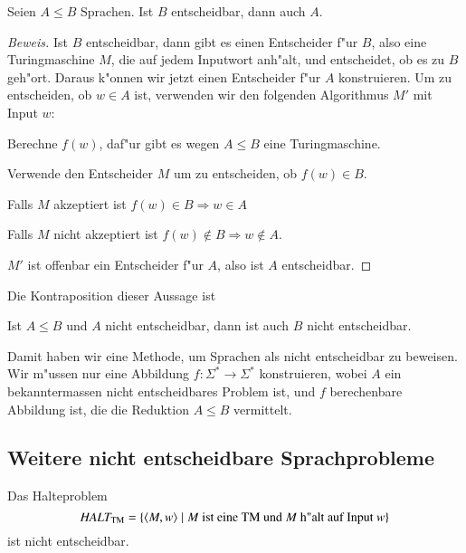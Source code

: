 \begin{satz}
Seien $A\le B$ Sprachen.
Ist $B$ entscheidbar, dann auch $A$.
\end{satz}

\begin{proof}[Beweis]
Ist $B$ entscheidbar, dann gibt es einen Entscheider f"ur $B$, also
eine Turingmaschine $M$, die auf jedem Inputwort anh"alt, und
entscheidet, ob es zu $B$ geh"ort.
Daraus k"onnen wir jetzt einen Entscheider f"ur $A$ konstruieren.
Um zu entscheiden, ob $w\in A$
ist, verwenden wir den folgenden Algorithmus $M'$ mit Input
$w$:
\medskip
\begin{compactenum}
\item Berechne $f(w)$, daf"ur gibt es wegen $A\le B$ eine Turingmaschine.
\item Verwende den Entscheider $M$ um zu entscheiden, ob $f(w)\in B$.
\item Falls $M$ akzeptiert ist $f(w)\in B\Rightarrow w\in A$
\item Falls $M$ nicht akzeptiert ist $f(w)\not\in B\Rightarrow w\not\in A$.
\end{compactenum}
\medskip
$M'$ ist offenbar ein Entscheider f"ur $A$, also ist $A$ entscheidbar.
\end{proof}

Die Kontraposition dieser Aussage ist
\begin{satz}
Ist $A\le B$ und $A$ nicht entscheidbar, dann ist auch $B$ nicht
entscheidbar.
\end{satz}
Damit haben wir eine Methode, um Sprachen als nicht entscheidbar 
zu beweisen.
Wir m"ussen nur eine Abbildung $f\colon \Sigma^*\to \Sigma^*$
konstruieren, wobei $A$ ein bekanntermassen nicht
entscheidbares Problem ist, und $f$ berechenbare Abbildung ist,
die die Reduktion $A\le B$ vermittelt.

\subsection{Weitere nicht entscheidbare Sprachprobleme}
%
\begin{satz} Das Halteproblem
\[
\text{\it HALT}_{\text{TM}}=\{\langle M,w\rangle\;|\;
\text{$M$ ist eine TM und $M$ h"alt auf Input $w$}\}
\]
%
ist nicht entscheidbar.
\end{satz}

